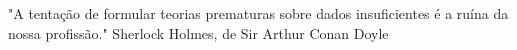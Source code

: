 \begin{dedica}  %

"A tentação de formular teorias prematuras sobre dados insuficientes é a ruína da nossa profissão." Sherlock Holmes, de Sir Arthur Conan Doyle

\end{dedica}
